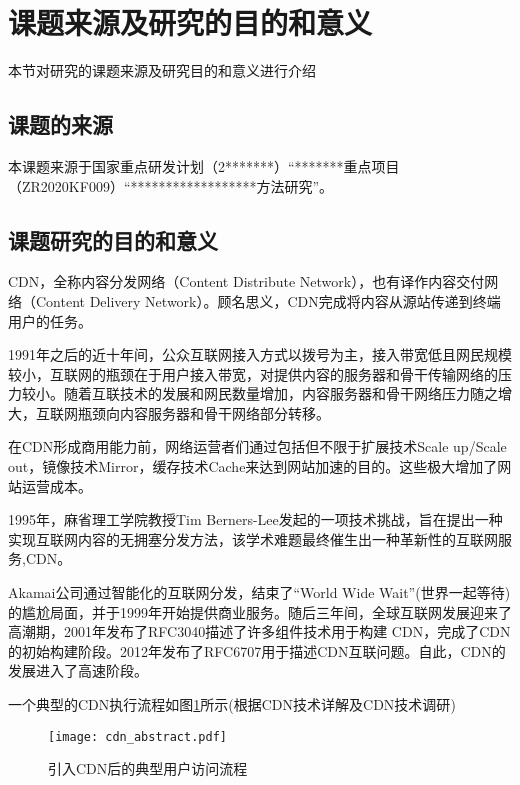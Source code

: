 \section{课题来源及研究的目的和意义}
	本节对研究的课题来源及研究目的和意义进行介绍
\subsection{课题的来源}
本课题来源于国家重点研发计划（2*******）“*******重点项目（ZR2020KF009）“******************方法研究”。
\subsection{课题研究的目的和意义}



CDN，全称内容分发网络（Content Distribute Network），也有译作内容交付网络（Content Delivery Network）。顾名思义，CDN完成将内容从源站传递到终端用户的任务。

1991年之后的近十年间，公众互联网接入方式以拨号为主，接入带宽低且网民规模较小，互联网的瓶颈在于用户接入带宽，对提供内容的服务器和骨干传输网络的压力较小。随着互联技术的发展和网民数量增加，内容服务器和骨干网络压力随之增大，互联网瓶颈向内容服务器和骨干网络部分转移。

在CDN形成商用能力前，网络运营者们通过包括但不限于扩展技术Scale up/Scale out，镜像技术Mirror，缓存技术Cache来达到网站加速的目的。这些极大增加了网站运营成本。

1995年，麻省理工学院教授Tim Berners-Lee发起的一项技术挑战，旨在提出一种实现互联网内容的无拥塞分发方法，该学术难题最终催生出一种革新性的互联网服务,CDN。

Akamai公司通过智能化的互联网分发，结束了“World Wide Wait”(世界一起等待)的尴尬局面，并于1999年开始提供商业服务。随后三年间，全球互联网发展迎来了高潮期，2001年发布了RFC3040\cite{RFC-3040}描述了许多组件技术用于构建 CDN，完成了CDN的初始构建阶段。2012年发布了RFC6707\cite{RFC-6707}用于描述CDN互联问题。自此，CDN的发展进入了高速阶段。 


一个典型的CDN执行流程如图\ref{fig:join_cdn_classic}所示(根据CDN技术详解\cite{leibaohua-CDN-2012}及CDN技术调研\cite{Pathan-survey-2007})


\begin{figure}[h]
	\centering
	\texttt{[image: cdn\_abstract.pdf]}
	\caption{引入CDN后的典型用户访问流程}
	\label{fig:join_cdn_classic}
\end{figure}




